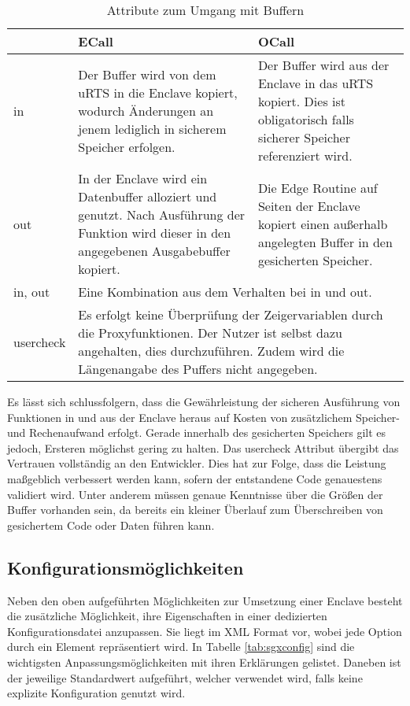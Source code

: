 \begin{table}[h]
	\centering
	\caption{Attribute zum Umgang mit Buffern}
	\begin{tabularx}{\textwidth}{|l|X|X|}
		\hline
		& \textbf{\ac{ECall}} & \textbf{\ac{OCall}} \\
		\hline
		in & Der Buffer wird von dem \ac{uRTS} in die Enclave kopiert, wodurch Änderungen an jenem lediglich in sicherem Speicher erfolgen. & Der Buffer wird aus der Enclave in das \ac{uRTS} kopiert. Dies ist obligatorisch falls sicherer Speicher referenziert wird. \\
		\hline
		out & In der Enclave wird ein Datenbuffer alloziert und genutzt. Nach Ausführung der Funktion wird dieser in den angegebenen Ausgabebuffer kopiert. & Die Edge Routine auf Seiten der Enclave kopiert einen außerhalb angelegten Buffer in den gesicherten Speicher. \\
		\hline
		in, out & \multicolumn{2}{l|}{Eine Kombination aus dem Verhalten bei in und out.} \\
		\hline
		user\textunderscore check & \multicolumn{2}{p{0.8\textwidth}|}{Es erfolgt keine Überprüfung der Zeigervariablen durch die Proxyfunktionen. Der Nutzer ist selbst dazu angehalten, dies durchzuführen. Zudem wird die Längenangabe des Puffers nicht angegeben.} \\
		\hline
	\end{tabularx}
	\label{tab:sgxbuffer}
\end{table}

Es lässt sich schlussfolgern, dass die Gewährleistung der sicheren Ausführung von Funktionen in und aus der Enclave heraus auf Kosten von zusätzlichem Speicher- und Rechenaufwand erfolgt. Gerade innerhalb des gesicherten Speichers gilt es jedoch, Ersteren möglichst gering zu halten. Das user\textunderscore check Attribut übergibt das Vertrauen vollständig an den Entwickler. Dies hat zur Folge, dass die Leistung maßgeblich verbessert werden kann, sofern der entstandene Code genauestens validiert wird. Unter anderem müssen genaue Kenntnisse über die Größen der Buffer vorhanden sein, da bereits ein kleiner Überlauf zum Überschreiben von gesichertem Code oder Daten führen kann.

\subsection{Konfigurationsmöglichkeiten}

Neben den oben aufgeführten Möglichkeiten zur Umsetzung einer Enclave besteht die zusätzliche Möglichkeit, ihre Eigenschaften in einer dedizierten Konfigurationsdatei anzupassen. Sie liegt im \acs{XML} Format vor, wobei jede Option durch ein Element repräsentiert wird. In Tabelle \ref{tab:sgxconfig} sind die wichtigsten Anpassungsmöglichkeiten mit ihren Erklärungen gelistet. Daneben ist der jeweilige Standardwert aufgeführt, welcher verwendet wird, falls keine explizite Konfiguration genutzt wird.

